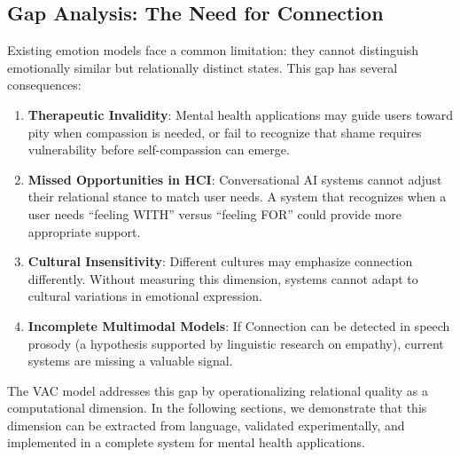 \subsection{Gap Analysis: The Need for Connection}

Existing emotion models face a common limitation: they cannot distinguish emotionally similar but relationally distinct states. This gap has several consequences:

\begin{enumerate}
    \item \textbf{Therapeutic Invalidity}: Mental health applications may guide users toward pity when compassion is needed, or fail to recognize that shame requires vulnerability before self-compassion can emerge.

    \item \textbf{Missed Opportunities in HCI}: Conversational AI systems cannot adjust their relational stance to match user needs. A system that recognizes when a user needs ``feeling WITH'' versus ``feeling FOR'' could provide more appropriate support.

    \item \textbf{Cultural Insensitivity}: Different cultures may emphasize connection differently. Without measuring this dimension, systems cannot adapt to cultural variations in emotional expression.

    \item \textbf{Incomplete Multimodal Models}: If Connection can be detected in speech prosody (a hypothesis supported by linguistic research on empathy), current systems are missing a valuable signal.
\end{enumerate}

The VAC model addresses this gap by operationalizing relational quality as a computational dimension. In the following sections, we demonstrate that this dimension can be extracted from language, validated experimentally, and implemented in a complete system for mental health applications.
